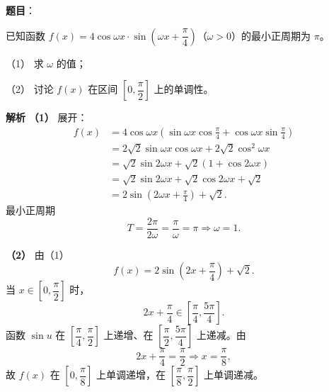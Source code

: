 \begin{answer}

\textbf{题目}：

已知函数 $f(x)=4\cos\omega x\cdot\sin\left(\omega x+\dfrac{\pi}{4}\right)$（$\omega>0$）的最小正周期为 $\pi$。

（1） 求 $\omega$ 的值；

（2） 讨论 $f(x)$ 在区间 $\left[0,\dfrac{\pi}{2}\right]$ 上的单调性。

\textbf{解析}
\textbf{（1）} 展开：
\nopagebreak[4]
\[\begin{aligned}
f(x)&=4\cos\omega x\left(\sin\omega x\cos\frac{\pi}{4}+\cos\omega x\sin\frac{\pi}{4}\right)\\
&=2\sqrt2\sin\omega x\cos\omega x+2\sqrt2\cos^2\omega x\\
&=\sqrt2\sin2\omega x+\sqrt2(1+\cos2\omega x)\\
&=\sqrt2\sin2\omega x+\sqrt2\cos2\omega x+\sqrt2\\
&=2\sin\left(2\omega x+\frac{\pi}{4}\right)+\sqrt2.
\end{aligned}\]
最小正周期
\nopagebreak[4]
\[T=\frac{2\pi}{2\omega}=\frac{\pi}{\omega}=\pi\Longrightarrow \omega=1.\]

\textbf{（2）} 由（1）
\nopagebreak[4]
\[f(x)=2\sin\left(2x+\frac{\pi}{4}\right)+\sqrt2.\]
当 $x\in\left[0,\dfrac{\pi}{2}\right]$ 时，
\nopagebreak[4]
\[2x+\frac{\pi}{4}\in\left[\frac{\pi}{4},\frac{5\pi}{4}\right].\]
函数 $\sin u$ 在 $\left[\dfrac{\pi}{4},\dfrac{\pi}{2}\right]$ 上递增、在 $\left[\dfrac{\pi}{2},\dfrac{5\pi}{4}\right]$ 上递减。由
\nopagebreak[4]
\[2x+\frac{\pi}{4}=\frac{\pi}{2}\Longrightarrow x=\frac{\pi}{8},\]
故 $f(x)$ 在 $\left[0,\dfrac{\pi}{8}\right]$ 上单调递增，在 $\left[\dfrac{\pi}{8},\dfrac{\pi}{2}\right]$ 上单调递减。



\end{answer}
